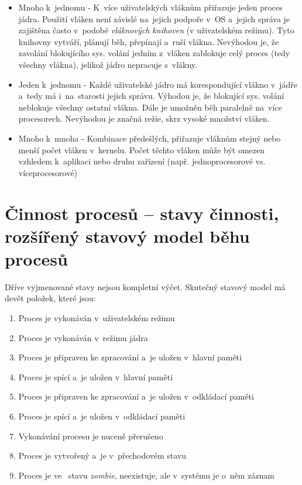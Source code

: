 \begin{itemize}
    \item Mnoho k~jednomu - K~více uživatelských vláknům přiřazuje jeden proces jádra. Použití vláken není závislé na~jejich podpoře v~OS a~jejich správa je zajištěna často v~podobě \emph{vláknových knihoven} (v uživatelském režimu). Tyto knihovny vytváří, plánují běh, přepínají a~ruší vlákna. Nevýhodou je, že zavolání blokujícího sys. volání jedním z~vláken zablokuje celý proces (tedy všechny vlákna), jelikož jádro nepracuje s~vlákny.  
    \item Jeden k~jednomu - Každé uživatelské jádro má korespondující vlákno v~jádře a~tedy má i~na~starosti jejich správu. Výhodou je, že blokující sys. volání neblokuje všechny ostatní vlákna. Dále je umožněn běh paralelně na~více procesorech. Nevýhodou je značná režie, skrz vysoké množství vláken.
    \item Mnoho k~mnoha - Kombinace předešlých, přiřazuje vláknům stejný nebo menší počet vláken v~kernelu. Počet těchto vláken může být omezen vzhledem k~aplikaci nebo druhu zařízení (např. jednoprocesorové vs. víceprocesorové)
\end{itemize}


\clearpage
\section{Činnost procesů -- stavy činnosti, rozšířený stavový model běhu procesů} \label{proces-work}

Dříve vyjmenované stavy nejsou kompletní výčet. Skutečný stavový model má devět položek, které jsou:

\begin{enumerate}
    \item Proces je vykonáván v~uživatelském režimu
    \item Proces je vykonáván v~režimu jádra
    \item Proces je připraven ke zpracování a~je uložen v~hlavní paměti
    \item Proces je spící a~je uložen v~hlavní paměti
    \item Proces je připraven ke zpracování a~je uložen v~odkládací paměti
    \item Proces je spící a~je uložen v~odkládací paměti
    \item Vykonávání procesu je nuceně přerušeno
    \item Proces je vytvořený a~je v~přechodovém stavu
    \item Proces je ve~ stavu \emph{zombie}, neexistuje, ale v~systému je o~něm záznam 
\end{enumerate}

